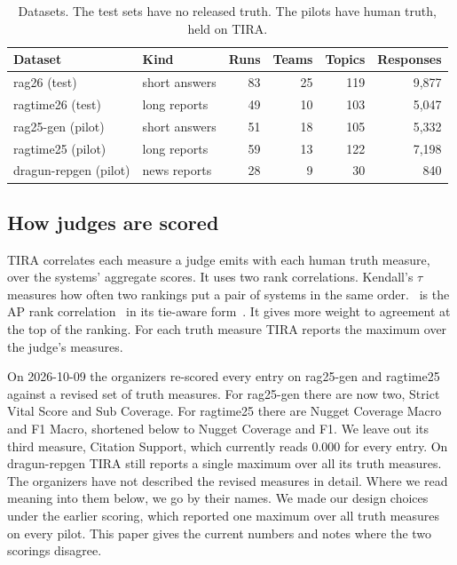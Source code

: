 \begin{table}
  \caption{Datasets. The test sets have no released truth. The pilots have human
  truth, held on TIRA.}
  \label{tab:data}
  \small
  \setlength{\tabcolsep}{3pt}
  \begin{tabular}{@{}llrrrr@{}}
    \toprule
    Dataset & Kind & Runs & Teams & Topics & Responses\\
    \midrule
    rag26 (test)          & short answers & 83 & 25 & 119 & 9,877\\
    ragtime26 (test)      & long reports  & 49 & 10 & 103 & 5,047\\
    \midrule
    rag25-gen (pilot)     & short answers & 51 & 18 & 105 & 5,332\\
    ragtime25 (pilot)     & long reports  & 59 & 13 & 122 & 7,198\\
    dragun-repgen (pilot) & news reports  & 28 & 9  & 30  & 840\\
    \bottomrule
  \end{tabular}
\end{table}

\subsection{How judges are scored}
\label{sec:scoring}

TIRA correlates each measure a judge emits with each human truth measure, over the
systems' aggregate scores. It uses two rank correlations. Kendall's
$\tau$~\cite{kendall1938new} measures how often two rankings put a pair of
systems in the same order. \tauap\ is the AP rank correlation~\cite{yilmaz2008new} in its
tie-aware form~\cite{urbano2017ties}. It gives more weight to agreement at the top
of the ranking. For each truth measure TIRA reports the maximum over
the judge's measures.

On 2026-10-09 the organizers re-scored every entry on rag25-gen and ragtime25
against a revised set of truth measures. For rag25-gen there are now two, Strict
Vital Score and Sub Coverage. For ragtime25 there are Nugget Coverage Macro and F1 Macro, shortened below to Nugget Coverage and F1. We leave out its third measure, Citation Support, which currently reads
0.000 for every entry. On dragun-repgen TIRA still reports a single maximum over
all its truth measures. The organizers have not described the revised measures in
detail. Where we read meaning into them below, we go by their names. We made our
design choices under the earlier scoring, which reported one maximum over all truth
measures on every pilot. This paper gives the current numbers and notes where the
two scorings disagree.

